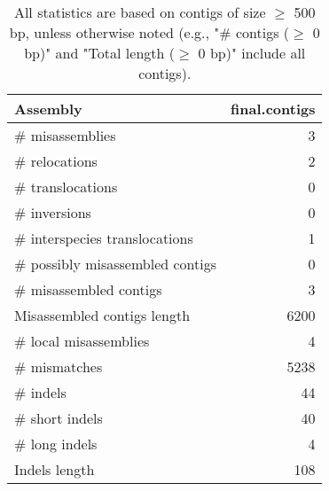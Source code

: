 \documentclass[12pt,a4paper]{article}
\begin{document}
\begin{table}[ht]
\begin{center}
\caption{All statistics are based on contigs of size $\geq$ 500 bp, unless otherwise noted (e.g., "\# contigs ($\geq$ 0 bp)" and "Total length ($\geq$ 0 bp)" include all contigs).}
\begin{tabular}{|l*{1}{|r}|}
\hline
Assembly & final.contigs \\ \hline
\# misassemblies & 3 \\ \hline
\hspace{5mm}\# relocations & 2 \\ \hline
\hspace{5mm}\# translocations & 0 \\ \hline
\hspace{5mm}\# inversions & 0 \\ \hline
\hspace{5mm}\# interspecies translocations & 1 \\ \hline
\# possibly misassembled contigs & 0 \\ \hline
\# misassembled contigs & 3 \\ \hline
Misassembled contigs length & 6200 \\ \hline
\# local misassemblies & 4 \\ \hline
\# mismatches & 5238 \\ \hline
\# indels & 44 \\ \hline
\hspace{5mm}\# short indels & 40 \\ \hline
\hspace{5mm}\# long indels & 4 \\ \hline
Indels length & 108 \\ \hline
\end{tabular}
\end{center}
\end{table}
\end{document}
